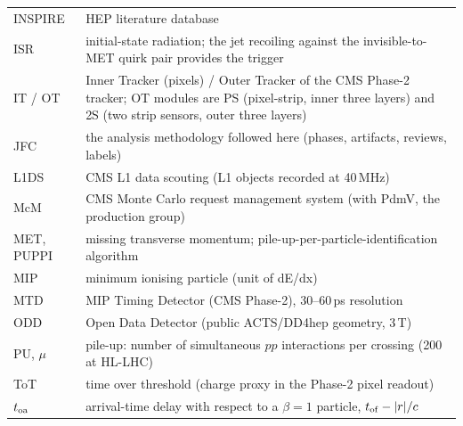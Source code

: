 \documentclass[11pt,a4paper]{article}
\begin{document}
{\begin{longtable}{@{}L{3.19cm}L{13.48cm}@{}}
INSPIRE & HEP literature database\\
ISR & initial-state radiation; the jet recoiling against the invisible-to-MET quirk pair provides the trigger\\
IT / OT & Inner Tracker (pixels) / Outer Tracker of the CMS Phase-2 tracker; OT modules are PS (pixel-strip, inner three layers) and 2S (two strip sensors, outer three layers)\\
JFC & the analysis methodology followed here (phases, artifacts, reviews, labels)\\
L1DS & CMS L1 data scouting (L1 objects recorded at 40\,MHz)\\
McM & CMS Monte Carlo request management system (with PdmV, the production group)\\
MET, PUPPI & missing transverse momentum; pile-up-per-particle-identification algorithm\\
MIP & minimum ionising particle (unit of dE/dx)\\
MTD & MIP Timing Detector (CMS Phase-2), 30--60\,ps resolution\\
ODD & Open Data Detector (public ACTS/DD4hep geometry, 3\,T)\\
PU, $\mu$ & pile-up: number of simultaneous $pp$ interactions per crossing (200 at HL-LHC)\\
ToT & time over threshold (charge proxy in the Phase-2 pixel readout)\\
$t_{\rm oa}$ & arrival-time delay with respect to a $\beta=1$ particle, $t_{\rm of}-|r|/c$\\
\end{longtable}
}

\end{document}
